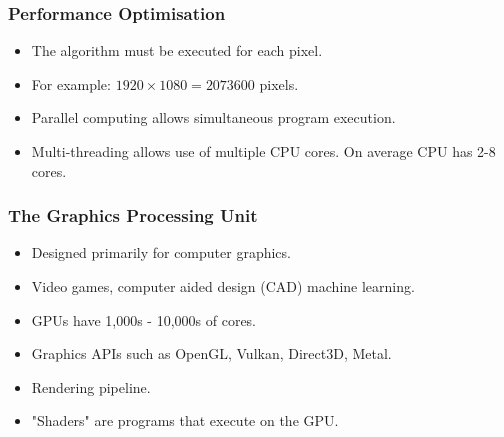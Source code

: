 \documentclass{beamer}
\begin{document}
\begin{frame}
\frametitle{Performance Optimisation}
\begin{itemize}
\item The algorithm must be executed for each pixel.
\item For example: $1920 \times 1080 = 2073600$ pixels.
\item Parallel computing allows simultaneous program execution.
\item Multi-threading allows use of multiple CPU cores. On average CPU has 2-8 cores.
\end{itemize}
\end{frame}


\begin{frame}
\frametitle{The Graphics Processing Unit}
\begin{itemize}
\item Designed primarily for computer graphics.
\item Video games, computer aided design (CAD) machine learning.
\item GPUs have 1,000s - 10,000s of cores.
\item Graphics APIs such as OpenGL, Vulkan, Direct3D, Metal.
\item Rendering pipeline.
\item "Shaders" are programs that execute on the GPU.
\end{itemize}
\end{frame}
\end{document}
